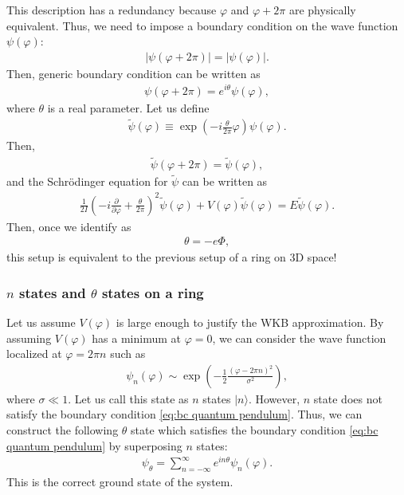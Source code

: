 \documentclass[11pt,a4paper]{article}
\begin{document}
This description has a redundancy because $\varphi$ and $\varphi + 2\pi$ are physically equivalent. Thus, we need to impose a boundary condition on the wave function $\psi(\varphi)$:
\begin{align}
    |\psi(\varphi + 2\pi)| = |\psi(\varphi)|.
\end{align}
Then, generic boundary condition can be written as
\begin{align}
    \psi(\varphi + 2\pi) = e^{i\theta} \psi(\varphi), \label{eq:bc quantum pendulum}
\end{align}
where $\theta$ is a real parameter. Let us define
\begin{align}
    \tilde\psi(\varphi) \equiv \exp\left(-i\frac{\theta}{2\pi} \varphi\right) \psi(\varphi).
\end{align}
Then,
\begin{align}
    \tilde\psi(\varphi + 2\pi) = \tilde\psi(\varphi),
\end{align}
and the Schr\"odinger equation for $\tilde\psi$ can be written as
\begin{align}
    \frac{1}{2I} \left( -i \frac{\partial}{\partial \varphi} + \frac{\theta}{2\pi} \right)^2 \tilde\psi(\varphi) + V(\varphi) \tilde\psi(\varphi) = E \tilde\psi(\varphi).
\end{align}
Then, once we identify as
\begin{align}
    \theta = -e \Phi,
\end{align}
this setup is equivalent to the previous setup of a ring on 3D space!


\subsubsection{$n$ states and $\theta$ states on a ring}
Let us assume $V(\varphi)$ is large enough to justify the WKB approximation. By assuming $V(\varphi)$ has a minimum at $\varphi = 0$, we can consider the wave function localized at $\varphi = 2\pi n$ such as
\begin{align}
    \psi_n(\varphi) \sim \exp\left( -\frac{1}{2} \frac{(\varphi - 2\pi n)^2}{\sigma^2} \right),
\end{align}
where $\sigma \ll 1$. Let us call this state as $n$ states $|n\rangle$. However, $n$ state does not satisfy the boundary condition \eqref{eq:bc quantum pendulum}.
Thus, we can construct the following $\theta$ state which satisfies the boundary condition \eqref{eq:bc quantum pendulum} by superposing $n$ states:
\begin{align}
    \psi_\theta = \sum_{n=-\infty}^\infty e^{i n \theta} \psi_n(\varphi).
\end{align}
This is the correct ground state of the system.
\end{document}
